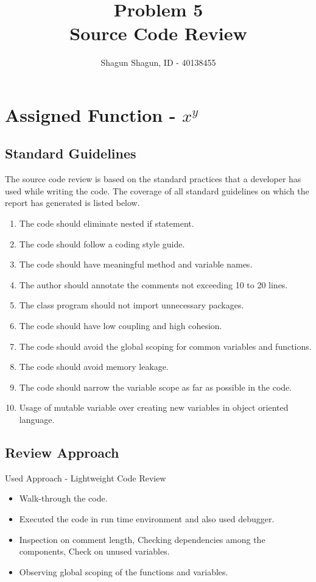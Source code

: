 \documentclass[a4paper,12pt]{article}
\title{Problem 5\\
\large Source Code Review}
\author{Shagun Shagun, ID - 40138455}
\date{}
\begin{document}
\maketitle %
\maketitle
\section{Assigned Function - $x^y$}
    \subsection{Standard Guidelines}
   The source code review is based on the standard practices that a developer has used while writing the code. The coverage of all standard guidelines on which the report has generated is listed below.
   \begin{enumerate}
        \item The code should eliminate nested if statement.
       \item The code should follow a coding style guide.
       \item The code should have meaningful method and variable names.
       \item The author should annotate the comments not exceeding 10 to 20 lines.
       \item The class program should not import unnecessary packages.
       \item The code should have low coupling and high cohesion.
       \item The code should avoid the global scoping for common variables and functions.
       \item The code should avoid memory leakage.
       \item The code should narrow the variable scope as far as possible in the code.
       \item Usage of mutable variable over creating new variables in object oriented language.
   \end{enumerate}
   
    \subsection{Review Approach}
    Used Approach - Lightweight Code Review
    \begin{itemize}
        \item Walk-through the code.
        \item Executed the code in run time environment and also used debugger.
        \item Inspection on comment length, Checking dependencies among the components, Check on unused variables.
        \item Observing global scoping of the functions and variables.
    \end{itemize}
    
\end{document}
